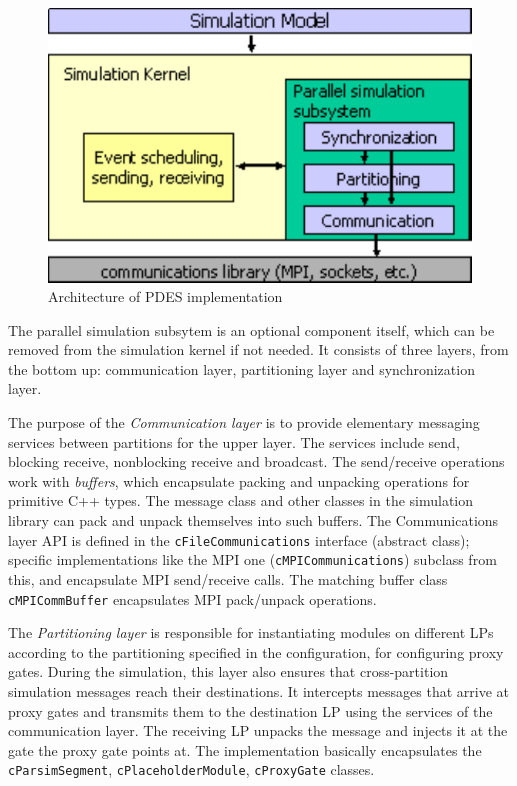\begin{figure}[htbp]
  \begin{center}
    \includegraphics{figures/parsim-arch}
    \caption{Architecture of {\opp} PDES implementation}
    \label{fig:parsim-arch}
  \end{center}
\end{figure}

The parallel simulation subsytem is an optional component
itself, which can be removed from the simulation kernel
if not needed. It consists of three layers, from the bottom up:
communication layer, partitioning layer and synchronization layer.

The purpose of the \textit{Communication layer} is to
provide elementary messaging services between partitions for the
upper layer. The services include send, blocking receive,
nonblocking receive and broadcast. The send/receive operations
work with \textit{buffers}, which encapsulate packing and unpacking
operations for primitive C++ types. The message class and
other classes in the simulation library can pack and unpack
themselves into such buffers. The Communications layer API
is defined in the \texttt{cFileCommunications} interface
(abstract class); specific implementations like the MPI
one (\texttt{cMPICommunications}) subclass from this,
and encapsulate MPI send/receive calls. The matching buffer
class \texttt{cMPICommBuffer} encapsulates MPI pack/unpack
operations.

The \textit{Partitioning layer} is responsible for instantiating
modules on different LPs according to the partitioning specified
in the configuration, for configuring proxy gates.
During the simulation, this layer also ensures that cross-partition
simulation messages reach their destinations. It intercepts messages
that arrive at proxy gates and transmits them to the destination LP
using the services of the communication layer. The receiving LP
unpacks the message and injects it at the gate the proxy gate points at.
The implementation basically encapsulates the
\texttt{cParsimSegment}, \texttt{cPlaceholderModule},
\texttt{cProxyGate} classes.

